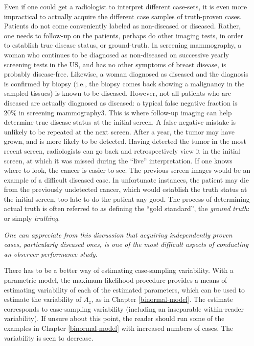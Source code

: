 \documentclass[
]{book}
\begin{document}
Even if one could get a radiologist to interpret different case-sets, it is even more impractical to actually acquire the different case samples of truth-proven cases. Patients do not come conveniently labeled as non-diseased or diseased. Rather, one needs to follow-up on the patients, perhaps do other imaging tests, in order to establish true disease status, or ground-truth. In screening mammography, a woman who continues to be diagnosed as non-diseased on successive yearly screening tests in the US, and has no other symptoms of breast disease, is probably disease-free. Likewise, a woman diagnosed as diseased and the diagnosis is confirmed by biopsy (i.e., the biopsy comes back showing a malignancy in the sampled tissues) is known to be diseased. However, not all patients who are diseased are actually diagnosed as diseased: a typical false negative fraction is 20\% in screening mammography3. This is where follow-up imaging can help determine true disease status at the initial screen. A false negative mistake is unlikely to be repeated at the next screen. After a year, the tumor may have grown, and is more likely to be detected. Having detected the tumor in the most recent screen, radiologists can go back and retrospectively view it in the initial screen, at which it was missed during the ``live'' interpretation. If one knows where to look, the cancer is easier to see. The previous screen images would be an example of a difficult diseased case. In unfortunate instances, the patient may die from the previously undetected cancer, which would establish the truth status at the initial screen, too late to do the patient any good. The process of determining actual truth is often referred to as defining the ``gold standard'', the \emph{ground truth}: or simply \emph{truthing}.

\emph{One can appreciate from this discussion that acquiring independently proven cases, particularly diseased ones, is one of the most difficult aspects of conducting an observer performance study}.

There has to be a better way of estimating case-sampling variability. With a parametric model, the maximum likelihood procedure provides a means of estimating variability of each of the estimated parameters, which can be used to estimate the variability of \(A_z\), as in Chapter \ref{binormal-model}. The estimate corresponds to case-sampling variability (including an inseparable within-reader variability). If unsure about this point, the reader should run some of the examples in Chapter \ref{binormal-model} with increased numbers of cases. The variability is seen to decrease.
\end{document}
